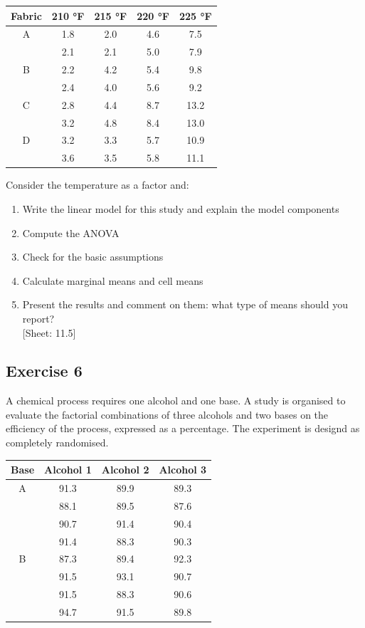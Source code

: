 \documentclass[a4paper,12pt,oneside]{book}
\providecommand{\tightlist}{%
  \setlength{\itemsep}{0pt}\setlength{\parskip}{0pt}}
\begin{document}
\begin{longtable}[]{@{}ccccc@{}}
\toprule
Fabric & 210 °F & 215 °F & 220 °F & 225 °F \\
\midrule
\endhead
A & 1.8 & 2.0 & 4.6 & 7.5 \\
& 2.1 & 2.1 & 5.0 & 7.9 \\
B & 2.2 & 4.2 & 5.4 & 9.8 \\
& 2.4 & 4.0 & 5.6 & 9.2 \\
C & 2.8 & 4.4 & 8.7 & 13.2 \\
& 3.2 & 4.8 & 8.4 & 13.0 \\
D & 3.2 & 3.3 & 5.7 & 10.9 \\
& 3.6 & 3.5 & 5.8 & 11.1 \\
\bottomrule
\end{longtable}

Consider the temperature as a factor and:

\begin{enumerate}
\def\labelenumi{\arabic{enumi}.}
\tightlist
\item
  Write the linear model for this study and explain the model components
\item
  Compute the ANOVA
\item
  Check for the basic assumptions
\item
  Calculate marginal means and cell means
\item
  Present the results and comment on them: what type of means should you report?\\
  {[}Sheet: 11.5{]}
\end{enumerate}

\hypertarget{exercise-6-2}{%
\subsection{Exercise 6}\label{exercise-6-2}}

A chemical process requires one alcohol and one base. A study is organised to evaluate the factorial combinations of three alcohols and two bases on the efficiency of the process, expressed as a percentage. The experiment is designd as completely randomised.

\begin{longtable}[]{@{}cccc@{}}
\toprule
Base & Alcohol 1 & Alcohol 2 & Alcohol 3 \\
\midrule
\endhead
A & 91.3 & 89.9 & 89.3 \\
& 88.1 & 89.5 & 87.6 \\
& 90.7 & 91.4 & 90.4 \\
& 91.4 & 88.3 & 90.3 \\
B & 87.3 & 89.4 & 92.3 \\
& 91.5 & 93.1 & 90.7 \\
& 91.5 & 88.3 & 90.6 \\
& 94.7 & 91.5 & 89.8 \\
\bottomrule
\end{longtable}
\end{document}
